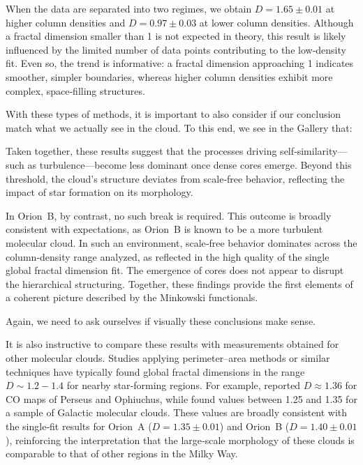 When the data are separated into two regimes, we obtain \(D = 1.65 \pm 0.01\) at higher column densities and \(D = 0.97 \pm 0.03\) at lower column densities.  
Although a fractal dimension smaller than 1 is not expected in theory, this result is likely influenced by the limited number of data points contributing to the low‑density fit.  
Even so, the trend is informative: a fractal dimension approaching 1 indicates smoother, simpler boundaries, whereas higher column densities exhibit more complex, space‑filling structures.

With these types of methods, it is important to also consider if our conclusion match what we actually see in the cloud. To this end, we see in the Gallery that: 

Taken together, these results suggest that the processes driving self‑similarity—such as turbulence—become less dominant once dense cores emerge.  
Beyond this threshold, the cloud’s structure deviates from scale‑free behavior, reflecting the impact of star formation on its morphology.

In Orion~B, by contrast, no such break is required.  
This outcome is broadly consistent with expectations, as Orion~B is known to be a more turbulent molecular cloud.  
In such an environment, scale‑free behavior dominates across the column‑density range analyzed, as reflected in the high quality of the single global fractal dimension fit.  
The emergence of cores does not appear to disrupt the hierarchical structuring.  
Together, these findings provide the first elements of a coherent picture described by the Minkowski functionals.

Again, we need to ask ourselves if visually these conclusions make sense.

It is also instructive to compare these results with measurements obtained for other molecular clouds.  
Studies applying perimeter–area methods or similar techniques have typically found global fractal dimensions in the range \(D \sim 1.2{-}1.4\) for nearby star‑forming regions.  
For example, \cite{falgarone1991hierarchical} reported \(D \approx 1.36\) for CO maps of Perseus and Ophiuchus, while \cite{sanchez2005fractal} found values between 1.25 and 1.35 for a sample of Galactic molecular clouds.  
These values are broadly consistent with the single‑fit results for Orion~A (\(D = 1.35 \pm 0.01\)) and Orion~B (\(D = 1.40 \pm 0.01\)), reinforcing the interpretation that the large‑scale morphology of these clouds is comparable to that of other regions in the Milky Way.

